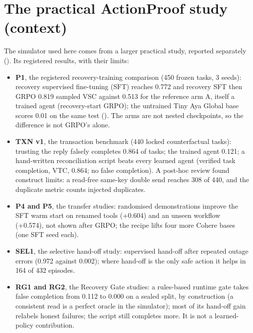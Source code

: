 \section{The practical ActionProof study (context)}\label{app4:practical}
The simulator used here comes from a larger practical study, reported separately
(). Its registered results, with their limits:
\begin{itemize}
\item \textbf{P1}, the registered recovery-training comparison (450 frozen tasks, 3 seeds): recovery supervised fine-tuning (SFT) reaches 0.772 and recovery SFT then GRPO 0.819 sampled VSC
against 0.513 for the reference arm A, itself a trained agent (recovery-start GRPO); the untrained Tiny Aya Global
base scores 0.01 on the same test (). The arms are not nested checkpoints, so the
difference is not GRPO's alone.
\item \textbf{TXN v1}, the transaction benchmark (440 locked counterfactual tasks): trusting the reply falsely completes 0.864 of tasks; the
trained agent 0.121; a hand-written reconciliation script beats every learned agent (verified task completion, VTC, 0.864; no false completion).
A post-hoc review found construct limits: a read-free same-key double send reaches 308 of 440, and the duplicate
metric counts injected duplicates.
\item \textbf{P4 and P5}, the transfer studies: randomised demonstrations improve the SFT warm start on renamed tools (+0.604) and an unseen
workflow (+0.574), not shown after GRPO; the recipe lifts four more Cohere bases (one SFT seed each).
\item \textbf{SEL1}, the selective hand-off study: supervised hand-off after repeated outage errors (0.972 against 0.002); where hand-off is the only
safe action it helps in 164 of 432 episodes.
\item \textbf{RG1 and RG2}, the Recovery Gate studies: a rules-based runtime gate takes false completion from 0.112 to 0.000 on a sealed split, by
construction (a consistent read is a perfect oracle in the simulator); most of its hand-off gain relabels honest
failures; the script still completes more. It is not a learned-policy contribution.
\end{itemize}



